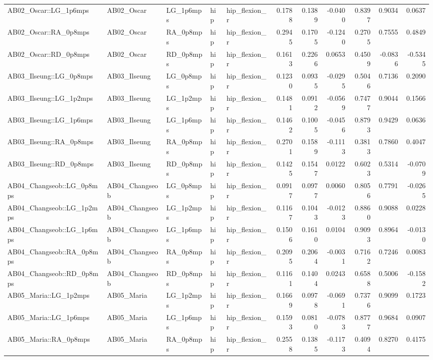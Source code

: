 \begin{table}
\begin{tabular}{lllllrrrrrr}
AB02_Oscar::LG_1p6mps & AB02_Oscar & LG_1p6mps & hip & hip_flexion_r & 0.1788 & 0.1389 & -0.0400 & 0.8397 & 0.9034 & 0.0637 \\
AB02_Oscar::RA_0p8mps & AB02_Oscar & RA_0p8mps & hip & hip_flexion_r & 0.2945 & 0.1705 & -0.1240 & 0.2705 & 0.7555 & 0.4849 \\
AB02_Oscar::RD_0p8mps & AB02_Oscar & RD_0p8mps & hip & hip_flexion_r & 0.1613 & 0.2266 & 0.0653 & 0.4509 & -0.0836 & -0.5345 \\
AB03_Ilseung::LG_0p8mps & AB03_Ilseung & LG_0p8mps & hip & hip_flexion_r & 0.1230 & 0.0935 & -0.0295 & 0.5046 & 0.7136 & 0.2090 \\
AB03_Ilseung::LG_1p2mps & AB03_Ilseung & LG_1p2mps & hip & hip_flexion_r & 0.1481 & 0.0912 & -0.0569 & 0.7477 & 0.9044 & 0.1566 \\
AB03_Ilseung::LG_1p6mps & AB03_Ilseung & LG_1p6mps & hip & hip_flexion_r & 0.1462 & 0.1005 & -0.0456 & 0.8793 & 0.9429 & 0.0636 \\
AB03_Ilseung::RA_0p8mps & AB03_Ilseung & RA_0p8mps & hip & hip_flexion_r & 0.2701 & 0.1589 & -0.1113 & 0.3813 & 0.7860 & 0.4047 \\
AB03_Ilseung::RD_0p8mps & AB03_Ilseung & RD_0p8mps & hip & hip_flexion_r & 0.1425 & 0.1547 & 0.0122 & 0.6023 & 0.5314 & -0.0709 \\
AB04_Changseob::LG_0p8mps & AB04_Changseob & LG_0p8mps & hip & hip_flexion_r & 0.0917 & 0.0977 & 0.0060 & 0.8056 & 0.7791 & -0.0265 \\
AB04_Changseob::LG_1p2mps & AB04_Changseob & LG_1p2mps & hip & hip_flexion_r & 0.1167 & 0.1043 & -0.0123 & 0.8860 & 0.9088 & 0.0228 \\
AB04_Changseob::LG_1p6mps & AB04_Changseob & LG_1p6mps & hip & hip_flexion_r & 0.1506 & 0.1610 & 0.0104 & 0.9093 & 0.8964 & -0.0130 \\
AB04_Changseob::RA_0p8mps & AB04_Changseob & RA_0p8mps & hip & hip_flexion_r & 0.2095 & 0.2064 & -0.0031 & 0.7162 & 0.7246 & 0.0083 \\
AB04_Changseob::RD_0p8mps & AB04_Changseob & RD_0p8mps & hip & hip_flexion_r & 0.1161 & 0.1404 & 0.0243 & 0.6588 & 0.5006 & -0.1582 \\
AB05_Maria::LG_1p2mps & AB05_Maria & LG_1p2mps & hip & hip_flexion_r & 0.1669 & 0.0978 & -0.0691 & 0.7376 & 0.9099 & 0.1723 \\
AB05_Maria::LG_1p6mps & AB05_Maria & LG_1p6mps & hip & hip_flexion_r & 0.1593 & 0.0810 & -0.0783 & 0.8777 & 0.9684 & 0.0907 \\
AB05_Maria::RA_0p8mps & AB05_Maria & RA_0p8mps & hip & hip_flexion_r & 0.2558 & 0.1385 & -0.1173 & 0.4094 & 0.8270 & 0.4175 \\

\end{tabular}
\end{table}
